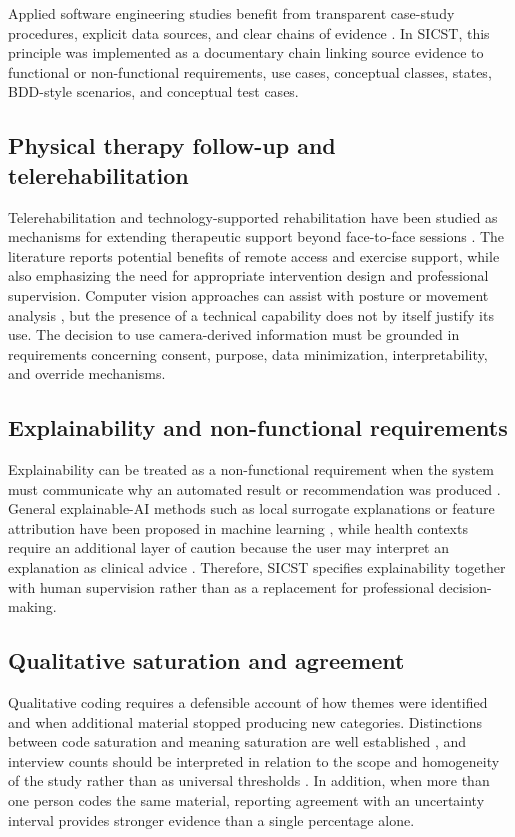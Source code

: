 \documentclass[pdflatex,sn-basic]{sn-jnl}
\begin{document}
Applied software engineering studies benefit from transparent case-study procedures, explicit data sources, and clear chains of evidence \citep{runeson2009guidelines}. In SICST, this principle was implemented as a documentary chain linking source evidence to functional or non-functional requirements, use cases, conceptual classes, states, BDD-style scenarios, and conceptual test cases.

\subsection{Physical therapy follow-up and telerehabilitation}
Telerehabilitation and technology-supported rehabilitation have been studied as mechanisms for extending therapeutic support beyond face-to-face sessions \citep{munoztomas2023telerehabilitation,susomarti2021effectiveness,gava2022shoulder}. The literature reports potential benefits of remote access and exercise support, while also emphasizing the need for appropriate intervention design and professional supervision. Computer vision approaches can assist with posture or movement analysis \citep{debnath2022rehabilitation,cao2021openpose,lugaresi2019mediapipe}, but the presence of a technical capability does not by itself justify its use. The decision to use camera-derived information must be grounded in requirements concerning consent, purpose, data minimization, interpretability, and override mechanisms.

\subsection{Explainability and non-functional requirements}
Explainability can be treated as a non-functional requirement when the system must communicate why an automated result or recommendation was produced \citep{chazette2020explainability}. General explainable-AI methods such as local surrogate explanations or feature attribution have been proposed in machine learning \citep{ribeiro2016lime,lundberg2017shap}, while health contexts require an additional layer of caution because the user may interpret an explanation as clinical advice \citep{holzinger2017xai}. Therefore, SICST specifies explainability together with human supervision rather than as a replacement for professional decision-making.

\subsection{Qualitative saturation and agreement}
Qualitative coding requires a defensible account of how themes were identified and when additional material stopped producing new categories. Distinctions between code saturation and meaning saturation are well established \citep{hennink2017codesaturation}, and interview counts should be interpreted in relation to the scope and homogeneity of the study rather than as universal thresholds \citep{guest2006interviews}. In addition, when more than one person codes the same material, reporting agreement with an uncertainty interval provides stronger evidence than a single percentage alone.
\end{document}
